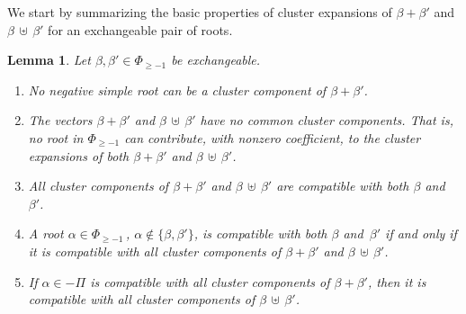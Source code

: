 \documentclass[letterpaper]{amsart}
\numberwithin{equation}{section}
\newtheorem{lemma}[theorem]{Lemma}
\theoremstyle{definition}
\newcommand{\credit}[1]{\smallskip\noindent {\textbf{#1.\ }}}
\def\subplus{{\,\uplus\,} }
\begin{document}
\credit{Proof of {\rm(\ref{eq:some-matrix-is-ss})}} 
We start by summarizing the basic properties of cluster 
expansions of $\beta + \beta'$ and $\beta \subplus \beta'$ for 
an exchangeable pair of roots. 
 
 
\begin{lemma} 
\label{lem:cluster-expansion-properties} 
Let $\beta,\beta'\in\Phi_{\geq -1}$ be exchangeable. 
 
\begin{enumerate} 
 
\item 
No negative simple root can be a cluster component of $\beta + \beta'$. 
 
\item 
The vectors $\beta + \beta'$ and $\beta \subplus \beta'$ 
have no common cluster components. 
That is, no root in $\Phi_{\geq -1}$ can contribute, 
with nonzero coefficient, 
to the cluster expansions of both $\beta + \beta'$ and $\beta \subplus 
\beta'$. 
 
\item 
All cluster components of $\beta + \beta'$ and $\beta \subplus \beta'$ are 
compatible with both $\beta$ and~$\beta'$. 
 
\item 
A root $\alpha \in \Phi_{\geq -1}\,$, $\alpha\notin\{\beta,\beta'\}$, 
is compatible with both $\beta$ and~$\beta'$ if and 
only if it is compatible with all cluster components of 
$\beta + \beta'$ and $\beta \subplus \beta'$. 
 
\item 
If $\alpha \in - \Pi$ is compatible 
with all cluster components of $\beta + \beta'$, 
then it is compatible 
with all cluster components of $\beta \subplus \beta'$. 
 \end{enumerate} 
\end{lemma} 
 
\end{document}
